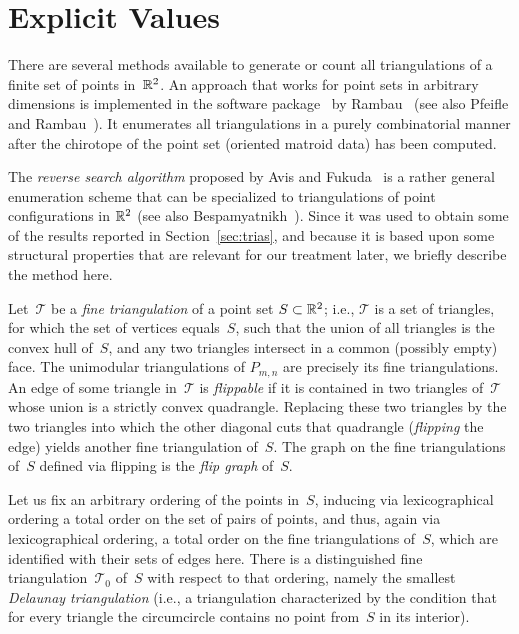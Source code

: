 \section{Explicit Values}
\label{sec:values}

There are several methods available to generate or count all
triangulations of a finite set of points in~$\mathbb{R}^2$. An approach that
works for point sets in arbitrary dimensions is implemented in the
software package \topcom\ by Rambau~\cite{Rambau-TOPCOM} (see also
Pfeifle and Rambau~\cite{PfeifleRambau}). It enumerates all
triangulations in a purely combinatorial manner after the chirotope of
the point set (oriented matroid data) has been computed.

The \emph{reverse search algorithm} proposed by Avis and
Fukuda~\cite{AvisFukuda} is a rather general enumeration scheme that
can be specialized to triangulations of point configurations in $\mathbb{R}^2$
(see also Bespamyatnikh~\cite{Bespamyatnikh}). Since it was used to
obtain some of the results reported in Section~\ref{sec:trias}, and
because it is based upon some structural properties that are relevant
for our treatment later, we briefly describe the method here.

Let~$\mathcal{T}$ be a \emph{fine triangulation} of a point set
$S\subset\mathbb{R}^2$; i.e., $\mathcal{T}$ is a set of triangles, for which
the set of vertices equals~$S$, such that the union of all triangles
is the convex hull of~$S$, and any two triangles intersect in a common
(possibly empty) face. The unimodular triangulations of $P_{m,n}$ are
precisely its fine triangulations. An edge of some triangle
in~$\mathcal{T}$ is \emph{flippable} if it is contained in two
triangles of~$\mathcal{T}$ whose union is a strictly convex
quadrangle.  Replacing these two triangles by the two triangles into
which the other diagonal cuts that quadrangle (\emph{flipping} the
edge) yields another fine triangulation of~$S$.  The graph on the fine
triangulations of~$S$ defined via flipping is the 
\emph{flip graph} of~$S$.

Let us fix an arbitrary ordering of the points in~$S$, inducing via
lexicographical ordering a total order on the set of pairs of points,
and thus, again via lexicographical ordering, a total order on the
fine triangulations of~$S$, which are identified with their sets of
edges here.   There is a distinguished fine
triangulation~$\mathcal{T}_0$ of~$S$ with respect to that ordering,
namely the smallest \emph{Delaunay triangulation} (i.e., 
a triangulation characterized by the condition that for every triangle
the circumcircle contains no point from~$S$ in its interior).

